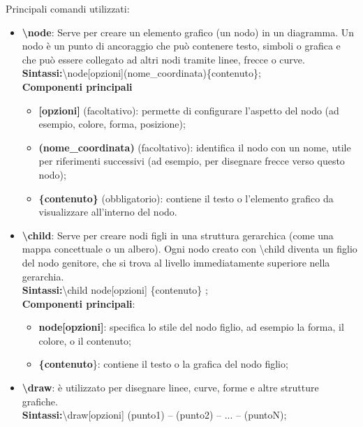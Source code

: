 \documentclass[portrait,a4paper]{article} %
\begin{document}
\par
\noindent
Principali comandi utilizzati:
\begin{itemize}
    \item \textbf{\textbackslash node{}}: Serve per creare un elemento grafico (un nodo) in un diagramma. Un nodo è un punto di ancoraggio che può contenere testo, simboli o grafica e che può essere collegato ad altri nodi tramite linee, frecce o curve.\\
    \textbf{Sintassi:}\textbackslash node[opzioni](nome\_coordinata)\{contenuto\};\\
    \textbf{Componenti principali}
        \begin{itemize}
            \item \textbf{[opzioni]} (facoltativo): permette di configurare l'aspetto del nodo (ad esempio, colore, forma, posizione);
            \item \textbf{(nome\_coordinata)} (facoltativo): identifica il nodo con un nome, utile per riferimenti successivi (ad esempio, per disegnare frecce verso questo nodo);
            \item \textbf{\{contenuto\}} (obbligatorio): contiene il testo o l'elemento grafico da visualizzare all'interno del nodo.
        \end{itemize}
     \item \textbf{\textbackslash child{}}: Serve per creare nodi figli in una struttura gerarchica (come una mappa concettuale o un albero). Ogni nodo creato con \textbackslash child diventa un figlio del nodo genitore, che si trova al livello immediatamente superiore nella gerarchia.\\
     \textbf{Sintassi:}\textbackslash child{ node[opzioni] \{contenuto\} };\\
     \textbf{Componenti principali}:
     \begin{itemize}
            \item \textbf{node[opzioni]}: specifica lo stile del nodo figlio, ad esempio la forma, il colore, o il contenuto;
            \item \textbf{\{contenuto}\}: contiene il testo o la grafica del nodo figlio;
    \end{itemize}
    \item \textbf{\textbackslash draw{}}: è utilizzato per disegnare linee, curve, forme e altre strutture grafiche.\\
    \textbf{Sintassi:}\textbackslash draw[opzioni] (punto1) -- (punto2) -- ... -- (puntoN);\\

\end{itemize}
\end{document}
